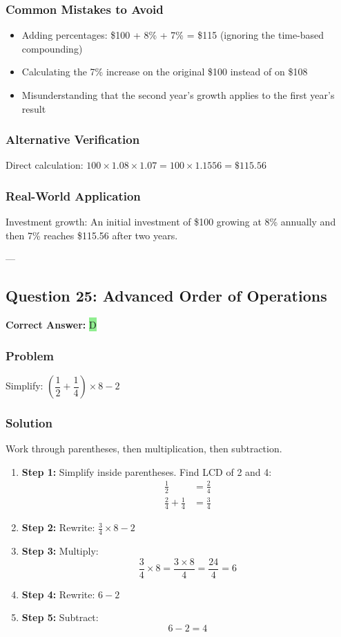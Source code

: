 \documentclass[12pt]{article}
\begin{document}
\subsubsection*{Common Mistakes to Avoid}
\begin{itemize}
\item Adding percentages: \$100 + 8\% + 7\% = \$115 (ignoring the time-based compounding)
\item Calculating the 7\% increase on the original \$100 instead of on \$108
\item Misunderstanding that the second year's growth applies to the first year's result
\end{itemize}

\subsubsection*{Alternative Verification}
Direct calculation: $100 \times 1.08 \times 1.07 = 100 \times 1.1556 = \$115.56$ 

\subsubsection*{Real-World Application}
Investment growth: An initial investment of \$100 growing at 8\% annually and then 7\% reaches \$115.56 after two years.

---

\subsection{Question 25: Advanced Order of Operations}

\textbf{Correct Answer: } \colorbox{lightgreen}{D}

\subsubsection*{Problem}
Simplify: $\left(\dfrac{1}{2} + \dfrac{1}{4}\right) \times 8 - 2$

\subsubsection*{Solution}

Work through parentheses, then multiplication, then subtraction.

\begin{enumerate}
\item \textbf{Step 1:} Simplify inside parentheses. Find LCD of 2 and 4:
  \begin{align*}
  \frac{1}{2} &= \frac{2}{4} \\
  \frac{2}{4} + \frac{1}{4} &= \frac{3}{4}
  \end{align*}
\item \textbf{Step 2:} Rewrite: $\frac{3}{4} \times 8 - 2$
\item \textbf{Step 3:} Multiply:
  \[
  \frac{3}{4} \times 8 = \frac{3 \times 8}{4} = \frac{24}{4} = 6
  \]
\item \textbf{Step 4:} Rewrite: $6 - 2$
\item \textbf{Step 5:} Subtract:
  \[
  6 - 2 = 4
  \]
\end{enumerate}
\end{document}
